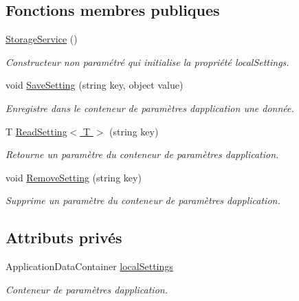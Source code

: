 \subsection*{Fonctions membres publiques}
\begin{DoxyCompactItemize}
\item 
\hyperlink{class_boxes_1_1_services_1_1_storage_1_1_storage_service_a2f694890a40c5e668fc6bafaa0b0999f}{Storage\+Service} ()
\begin{DoxyCompactList}\small\item\em Constructeur non paramétré qui initialise la propriété {\ttfamily local\+Settings}. \end{DoxyCompactList}\item 
void \hyperlink{class_boxes_1_1_services_1_1_storage_1_1_storage_service_aa02af3f5aead556a10db366c013c7ee4}{Save\+Setting} (string key, object value)
\begin{DoxyCompactList}\small\item\em Enregistre dans le conteneur de paramètres d\textquotesingle{}application une donnée.  \end{DoxyCompactList}\item 
T \hyperlink{class_boxes_1_1_services_1_1_storage_1_1_storage_service_a401d9d4c2a4c67aa05134cc5f174ffa8}{Read\+Setting$<$ T $>$} (string key)
\begin{DoxyCompactList}\small\item\em Retourne un paramètre du conteneur de paramètres d\textquotesingle{}application.  \end{DoxyCompactList}\item 
void \hyperlink{class_boxes_1_1_services_1_1_storage_1_1_storage_service_a3942ae238059a248a89ff00cfa9551b3}{Remove\+Setting} (string key)
\begin{DoxyCompactList}\small\item\em Supprime un paramètre du conteneur de paramètres d\textquotesingle{}application.  \end{DoxyCompactList}\end{DoxyCompactItemize}
\subsection*{Attributs privés}
\begin{DoxyCompactItemize}
\item 
Application\+Data\+Container \hyperlink{class_boxes_1_1_services_1_1_storage_1_1_storage_service_a6858aca239e79beeda3ef7e6da6c5f61}{local\+Settings}
\begin{DoxyCompactList}\small\item\em Conteneur de paramètres d\textquotesingle{}application. \end{DoxyCompactList}\end{DoxyCompactItemize}


